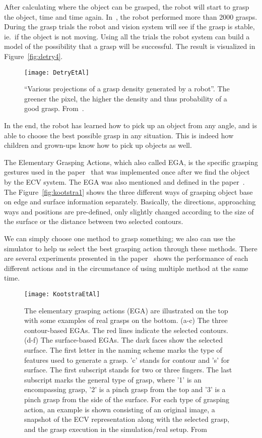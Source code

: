 After calculating where the object can be grasped, the robot will start to grasp the object, time and time again. 
In~\cite{detry}, the robot performed more than 2000 grasps.
During the grasp trials the robot and vision system will see if the grasp is stable, ie.\ if the object is not moving. 
Using all the trials the robot system can build a model of the possibility that a grasp will be successful. 
The result is visualized in Figure~\vref{fig:detry4}.

\begin{figure}
	\centering
	\texttt{[image: DetryEtAl]}
	\caption{``Various projections of a grasp density generated by a robot''. The greener the pixel, the higher the density and thus probability of a good grasp. From~\cite{detry}.}
\label{fig:detry4}
\end{figure}

In the end, the robot has learned how to pick up an object from any angle,
and is able to choose the best possible grasp in any situation.
This is indeed how children and grown-ups know how to pick up objects as well.

The Elementary Grasping Actions, which also called EGA, is the specific grasping gestures used in the paper~\cite{kootstra} that was implemented once after we find the object by the ECV system. 
The EGA was also mentioned and defined in the paper~\cite{pugeault}. 
The Figure~\vref{fig:kootstra1} shows the three different ways of grasping object base on edge and surface information separately. 
Basically, the directions, approaching ways and positions are pre-defined, only slightly changed according to the size of the surface or the distance between two selected contours. 

We can simply choose one method to grasp something; we also can use the simulator to help us select the best grasping action through these methods. There are several experiments presented in the paper~\cite{kootstra} shows the performance of each different actions and in the circumstance of using multiple method at the same time. 

\begin{figure}
	\centering
	\texttt{[image: KootstraEtAl]}
	\caption{The elementary grasping actions (EGA) are illustrated on the top with some examples of real grasps on the bottom. (a-c) The three contour-based EGAs. The red lines indicate the selected contours. (d-f) The surface-based EGAs. The dark faces show the selected surface. The first letter in the naming scheme marks the type of features used to generate a grasp. ’c’ stands for contour and ’s’ for surface. The first subscript stands for two or three fingers. The last subscript marks the general type of grasp, where ’1’ is an encompassing grasp, ’2’ is a pinch grasp from the top and ’3’ is a pinch grasp from the side of the surface. For each type of grasping action, an example is shown consisting of an original image, a snapshot of the ECV representation along with the selected grasp, and the grasp execution in the simulation/real setup. From~\cite{kootstra}}
	\label{fig:kootstra1}
\end{figure}